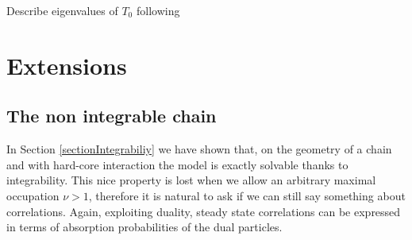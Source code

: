 \documentclass[10pt]{article}
\numberwithin{equation}{section}
\numberwithin{equation}{subsection}
\begin{document}
Describe eigenvalues of $T_0$ following 
\cite{Belliard2} 
\section{Extensions}
\subsection{The non integrable chain}
In Section \ref{sectionIntegrabiliy} we have shown that, on the geometry of a chain and with hard-core interaction the model is exactly solvable thanks to integrability. This nice property is lost when we allow an arbitrary maximal occupation $\nu>1$, therefore it is natural to ask if we can still say something about correlations. Again, exploiting duality, steady state correlations can be expressed in terms of absorption probabilities of the dual particles.
\end{document}
